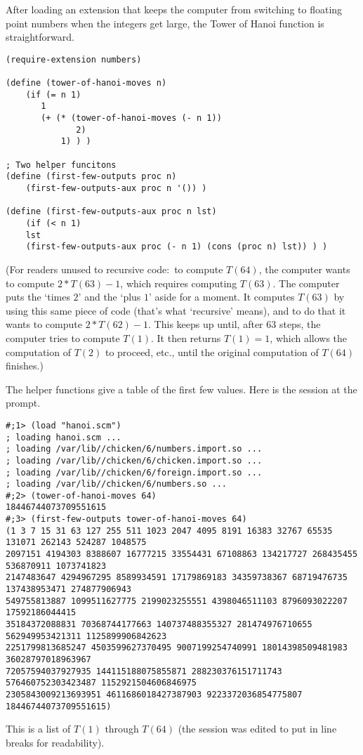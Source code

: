 After loading an extension that keeps the computer from switching to
floating point numbers when the integers get large,
the Tower of Hanoi function is straightforward.
\begin{lstlisting}
(require-extension numbers)

(define (tower-of-hanoi-moves n) 
    (if (= n 1)
       1
       (+ (* (tower-of-hanoi-moves (- n 1)) 
              2) 
           1) ) )

; Two helper funcitons
(define (first-few-outputs proc n)
    (first-few-outputs-aux proc n '()) )

(define (first-few-outputs-aux proc n lst)
    (if (< n 1)
    lst 
    (first-few-outputs-aux proc (- n 1) (cons (proc n) lst)) ) )
\end{lstlisting}
\noindent (For readers unused to recursive code:~to compute $T(64)$, 
the computer wants to compute $2*T(63)-1$, which requires
computing $T(63)$.
The computer puts the `times $2$' and the `plus $1$' aside for a moment.
It computes  $T(63)$ by using this same piece of code (that's 
what `recursive' means), and to do that it wants to compute $2*T(62)-1$.
This keeps up until, after $63$ steps, the computer
tries to compute $T(1)$.
It then returns $T(1)=1$, 
which allows the computation of $T(2)$ to proceed,
etc., until the original computation of $T(64)$ finishes.)

The helper functions give a table of the first few 
values.
Here is the session at the prompt.
\begin{lstlisting}
#;1> (load "hanoi.scm")
; loading hanoi.scm ...
; loading /var/lib//chicken/6/numbers.import.so ...
; loading /var/lib//chicken/6/chicken.import.so ...
; loading /var/lib//chicken/6/foreign.import.so ...
; loading /var/lib//chicken/6/numbers.so ...
#;2> (tower-of-hanoi-moves 64)
18446744073709551615
#;3> (first-few-outputs tower-of-hanoi-moves 64)
(1 3 7 15 31 63 127 255 511 1023 2047 4095 8191 16383 32767 65535 131071 262143 524287 1048575 
2097151 4194303 8388607 16777215 33554431 67108863 134217727 268435455 536870911 1073741823 
2147483647 4294967295 8589934591 17179869183 34359738367 68719476735 137438953471 274877906943 
549755813887 1099511627775 2199023255551 4398046511103 8796093022207 17592186044415 
35184372088831 70368744177663 140737488355327 281474976710655 562949953421311 1125899906842623 
2251799813685247 4503599627370495 9007199254740991 18014398509481983 36028797018963967 
72057594037927935 144115188075855871 288230376151711743 576460752303423487 1152921504606846975 
2305843009213693951 4611686018427387903 9223372036854775807 18446744073709551615)
\end{lstlisting}
\noindent This is a list of $T(1)$ through $T(64)$ (the session was 
edited to put in line breaks for readability).
\endinput


